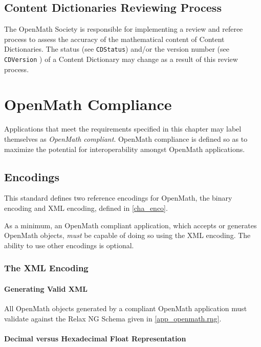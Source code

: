\documentclass{report}
\def\OM{OpenMath\xspace}
\def\XML{XML\xspace}
\begin{document}
\section{Content Dictionaries Reviewing Process}\label{cdapprove}

The \OM Society is responsible for implementing a review and referee process to assess the
accuracy of the mathematical content of Content Dictionaries.  The status (see
\lstinline|CDStatus|) and/or the version number (see \lstinline|CDVersion| ) of a
Content Dictionary may change as a result of this review process.

\chapter{\OM Compliance}\label{cha_comp}

Applications that meet the requirements specified in this chapter may label themselves as
\emph{OpenMath compliant}. \OM compliance is defined so as to maximize the potential for
interoperability amongst \OM applications.

\section{Encodings}\label{sec_compl_encoding}

This standard defines two reference encodings for \OM, the binary encoding and \XML
encoding, defined in \ref{cha_enco}.

As a minimum, an \OM compliant application, which accepts or generates \OM objects,
\emph{must} be capable of doing so using the \XML encoding.  The ability to use other
encodings is optional.


\subsection{The XML Encoding}\label{sec_compl_xml_encoding}

\subsubsection{Generating Valid XML}\label{sec_compl_xml_encoding_val}

All \OM objects generated by a compliant \OM application must validate against the Relax
NG Schema given in \ref{app_openmath.rng}.

\subsubsection{Decimal versus Hexadecimal Float Representation}\label{sec_compl_xml_encoding_float}
\end{document}
